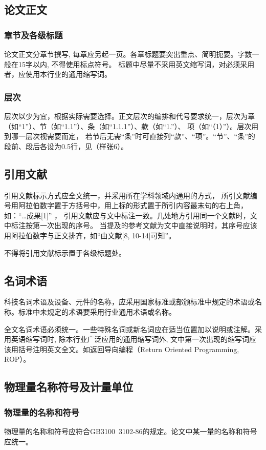     
    \subsection{论文正文}
    \subsubsection{章节及各级标题}
        论文正文分章节撰写, 每章应另起一页。各章标题要突出重点、简明扼要。字数一般在15字以内, 不得使用标点符号。
        标题中尽量不采用英文缩写词，对必须采用者，应使用本行业的通用缩写词。

    \subsubsection{层次}
        层次以少为宜，根据实际需要选择。正文层次的编排和代号要求统一，层次为章（如“1”）、节（如“1.1”）、条（如“1.1.1”）、款（如“1.”）、
        项（如“（1）”）。层次用到哪一层次视需要而定，
        若节后无需“条”时可直接列“款”、“项”。“节”、“条”的段前、段后各设为0.5行，见（样张6）。

    \subsection{引用文献}
    引用文献标示方式应全文统一，并采用所在学科领域内通用的方式，
    所引文献编号用阿拉伯数字置于方括号中，用上标的形式置于所引内容最末句的右上角，如：“…成果[1]” ，
    引用文献应与文中标注一致。几处地方引用同一个文献时，文中标注按第一次出现的序号。
    当提及的参考文献为文中直接说明时，其序号应该用阿拉伯数字与正文排齐，如“由文献[8, 10-14]可知”。

    不得将引用文献标示置于各级标题处。
    \subsection{名词术语}
    科技名词术语及设备、元件的名称，应采用国家标准或部颁标准中规定的术语或名称。标准中未规定的术语要采用行业通用术语或名称。
    
    全文名词术语必须统一。一些特殊名词或新名词应在适当位置加以说明或注解。采用英语缩写词时, 除本行业广泛应用的通用缩写词外, 
    文中第一次出现的缩写词应该用括号注明英文全文。如返回导向编程（Return Oriented Programming, ROP）。
    \subsection{物理量名称符号及计量单位}
    \subsubsection{物理量的名称和符号}
        物理量的名称和符号应符合GB3100~3102-86的规定。论文中某一量的名称和符号应统一。
